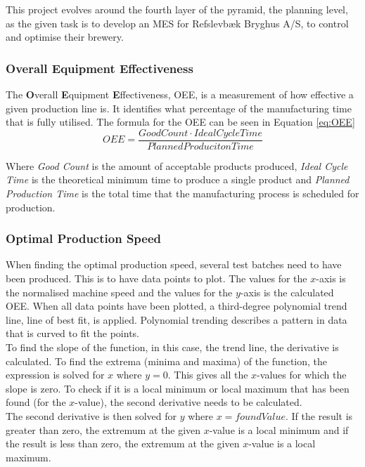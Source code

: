 This project evolves around the fourth layer of the pyramid, the planning level,
as the given task is to develop an MES for Refslevbæk Bryghus A/S, to control
and optimise their brewery. 


\subsubsection{Overall Equipment Effectiveness}
The \textbf{O}verall \textbf{E}quipment \textbf{E}ffectiveness, OEE, is a
measurement of how effective a given production line is. It identifies what
percentage of the manufacturing time that is fully utilised. The formula for
the OEE can be seen in Equation \ref{eq:OEE}
\begin{equation} \label{eq:OEE}
    OEE = \frac{Good Count \cdot Ideal Cycle Time}{Planned Produciton Time}
\end{equation}

Where \textit{Good Count} is the amount of acceptable products produced,
\textit{Ideal Cycle Time} is the theoretical minimum time to produce a single
product and \textit{Planned Production Time} is the total time that the
manufacturing process is scheduled for production. \cite{oee}

\subsubsection{Optimal Production Speed}
When finding the optimal production speed, several test batches need to have
been produced. This is to have data points to plot. The values for the
\(x\)-axis is the normalised machine speed and the values for the \(y\)-axis is
the calculated OEE. When all data points have been plotted, a third-degree
polynomial trend line, line of best fit, is applied. Polynomial trending
describes a pattern in data that is curved to fit the points.\\

To find the slope of the function, in this case, the trend line, the derivative
is calculated. To find the extrema (minima and maxima) of the function, the
expression is solved for \(x\) where \(y = 0\). This gives all the \(x\)-values
for which the slope is zero. To check if it is a local minimum or local maximum
that has been found (for the \(x\)-value), the second derivative needs to be
calculated.\\

The second derivative is then solved for \(y\) where \(x = found Value\). If the
result is greater than zero, the extremum at the given \(x\)-value is a local
minimum and if the result is less than zero, the extremum at the given 
\(x\)-value is a local maximum.\\ \cite{ops}

